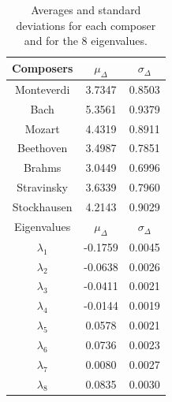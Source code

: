 \documentclass[
 aip,
 jmp,
 amsmath,amssymb,
 reprint,
]{revtex4-1}
\begin{document}
\begin{table}
  \caption{\label{tab:tableDmus}Averages and standard deviations
    for each composer and for the 8 eigenvalues.}
  
  \begin{tabular}{|c||c|c|}
    \hline
    Composers & $\mu_{\Delta}$ & $\sigma_{\Delta}$ \\
    \hline
    Monteverdi     & 3.7347 & 0.8503 \\
    Bach           & 5.3561 & 0.9379 \\
    Mozart         & 4.4319 & 0.8911 \\
    Beethoven      & 3.4987 & 0.7851 \\
    Brahms         & 3.0449 & 0.6996 \\
    Stravinsky     & 3.6339 & 0.7960 \\
    Stockhausen    & 4.2143 & 0.9029 \\
    \hline \hline
    Eigenvalues & $\mu_{\Delta}$ & $\sigma_{\Delta}$ \\
    \hline
    $\lambda_1$ &  -0.1759 & 0.0045 \\
    $\lambda_2$ &  -0.0638 & 0.0026 \\
    $\lambda_3$ &  -0.0411 & 0.0021 \\
    $\lambda_4$ &  -0.0144 & 0.0019 \\
    $\lambda_5$ &   0.0578 & 0.0021 \\
    $\lambda_6$ &   0.0736 & 0.0023 \\
    $\lambda_7$ &   0.0080 & 0.0027 \\
    $\lambda_8$ &   0.0835 & 0.0030 \\
    \hline
  \end{tabular}
\end{table}
\end{document}
